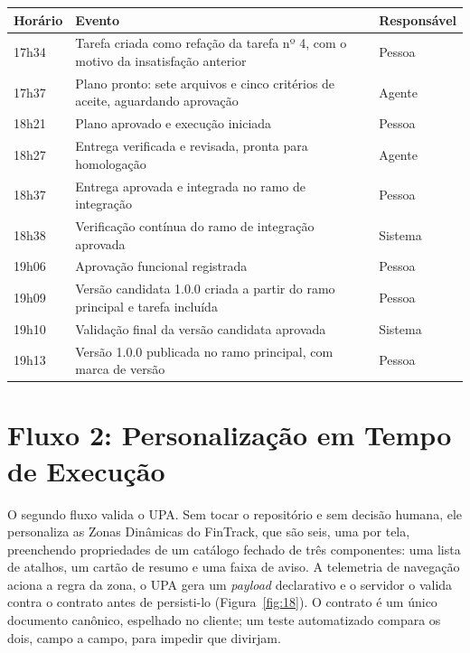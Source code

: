 \begin{quadro}[htb]
\centering
\caption{Linha do tempo da tarefa nº 6, conforme os registros do sistema (8 de outubro de 2026)}
\label{quadro:5}
\footnotesize
\renewcommand{\arraystretch}{1.25}
\begin{tabularx}{\textwidth}{|X|X|X|}
\hline
\textbf{Horário} & \textbf{Evento} & \textbf{Responsável} \\
\hline
17h34 & Tarefa criada como refação da tarefa nº 4, com o motivo da insatisfação anterior & Pessoa \\
\hline
17h37 & Plano pronto: sete arquivos e cinco critérios de aceite, aguardando aprovação & Agente \\
\hline
18h21 & Plano aprovado e execução iniciada & Pessoa \\
\hline
18h27 & Entrega verificada e revisada, pronta para homologação & Agente \\
\hline
18h37 & Entrega aprovada e integrada no ramo de integração & Pessoa \\
\hline
18h38 & Verificação contínua do ramo de integração aprovada & Sistema \\
\hline
19h06 & Aprovação funcional registrada & Pessoa \\
\hline
19h09 & Versão candidata 1.0.0 criada a partir do ramo principal e tarefa incluída & Pessoa \\
\hline
19h10 & Validação final da versão candidata aprovada & Sistema \\
\hline
19h13 & Versão 1.0.0 publicada no ramo principal, com marca de versão & Pessoa \\
\hline
\end{tabularx}
\end{quadro}

\section{Fluxo 2: Personalização em Tempo de Execução}\label{sec:5.5}

O segundo fluxo valida o UPA. Sem tocar o repositório e sem decisão humana, ele personaliza as Zonas Dinâmicas do FinTrack, que são seis, uma por tela, preenchendo propriedades de um catálogo fechado de três componentes: uma lista de atalhos, um cartão de resumo e uma faixa de aviso. A telemetria de navegação aciona a regra da zona, o UPA gera um \textit{payload} declarativo e o servidor o valida contra o contrato antes de persisti-lo (Figura~\ref{fig:18}). O contrato é um único documento canônico, espelhado no cliente; um teste automatizado compara os dois, campo a campo, para impedir que divirjam.

